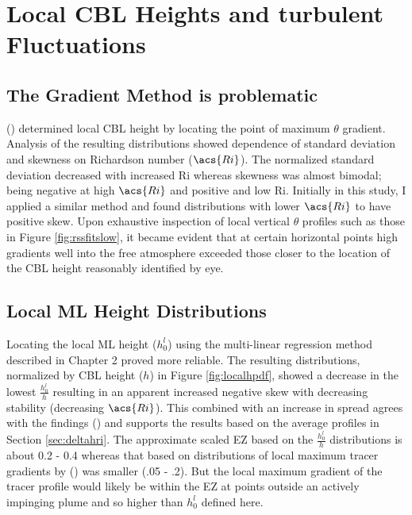 
\section{Local \acs{CBL} Heights and turbulent Fluctuations}

\subsection{The Gradient Method is problematic}

\citeauthor{SullMoengStev} (\citeyear{SullMoengStev}) determined local \acs{CBL} height by locating the point of maximum $\theta$ gradient.  Analysis of the resulting distributions showed dependence of standard deviation and skewness on Richardson number ($\acs{Ri}$).  The normalized standard deviation decreased with increased \acs{Ri} whereas skewness was almost bimodal; being negative at high $\acs{Ri}$ and positive and low \acs{Ri}.  Initially in this study, I applied a similar method and found distributions with lower $\acs{Ri}$ to have positive skew.  Upon exhaustive inspection of local vertical $\theta$  profiles such as those in Figure \ref{fig:rssfitslow}, it became evident that at certain horizontal points high gradients well into the free atmosphere exceeded those closer to the location of the \acs{CBL} height reasonably identified by eye.\\

\subsection{Local \acs{ML} Height Distributions}

Locating the local \acs{ML} height ($h^{l}_{0}$) using the multi-linear regression method described in Chapter 2 proved more reliable.  The resulting distributions, normalized by \acs{CBL} height ($h$) in Figure \ref{fig:localhpdf},  showed a decrease in the lowest $\frac{h^{l}_{0}}{h}$ resulting in an apparent increased negative skew with decreasing stability (decreasing $\acs{Ri}$). This combined with an increase in spread agrees with the findings \citeauthor{SullMoengStev} (\citeyear{SullMoengStev}) and supports the results based on the average profiles in Section \ref{sec:deltahri}.  The approximate scaled \acs{EZ} based on the $\frac{h^{l}_{0}}{h}$ distributions is about 0.2 - 0.4 whereas that based on distributions of local maximum tracer gradients by  \citeauthor{BrooksFowler2} (\citeyear{BrooksFowler2}) was smaller (.05 - .2).  But the local maximum gradient of the tracer profile would likely be within the \acs{EZ} at points outside an actively impinging plume and so higher than $h^{l}_{0}$ defined here. \\  


